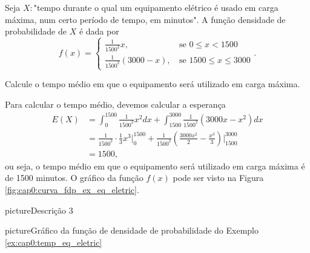 \begin{example}
	\label{ex:cap0:temp_eq_eletric}
	Seja $X:$"tempo durante o qual um equipamento elétrico é usado em carga máxima, num certo período de tempo, em minutos". A função densidade de probabilidade de $X$ é dada por
	\[
		f(x)=\begin{cases}
			\frac{1}{1500^2}x\text{,}&\text{ se } 0 \leqslant x < 1500\\
			\frac{1}{1500^2}(3000-x)\text{,}&\text{ se } 1500\leqslant x \leqslant 3000
		\end{cases}
		\text{.}
	\]
	
	Calcule o tempo médio em que o equipamento será utilizado em carga máxima.
	
	Para calcular o tempo médio, devemos calcular a esperança
	\begin{align*}
		E(X)&=\int_{0}^{1500} \frac{1}{1500^2}x^2dx
			 +\int_{1500}^{3000}\frac{1}{1500^2}(3000x-x^2)dx\\
			&=\frac{1}{1500^2}\cdot \frac{1}{3}x^3\Big|_{0}^{1500}
			 +\frac{1}{1500^2}\left (\frac{3000x^2}{2} - \frac{x^3}{3} \right ) \Big|_{1500}^{3000}\\
			&=1500\text{,}
	\end{align*}
	ou seja, o tempo médio em que o equipamento será utilizado em carga máxima é de 1500 minutos. O gráfico da função $f(x)$ pode ser visto na Figura \ref{fig:cap0:curva_fdp_ex_eq_eletric}.
\end{example}

\begin{sidepicture}{10cm}{picture}{Descrição 3}
	\label{testlabel6}
\end{sidepicture}

\begin{sidepicture}{5cm}{picture}{Gráfico da função de densidade de probabilidade do Exemplo \ref{ex:cap0:temp_eq_eletric}}
	\label{fig:cap0:curva_fdp_ex_eq_eletric}
\end{sidepicture}

